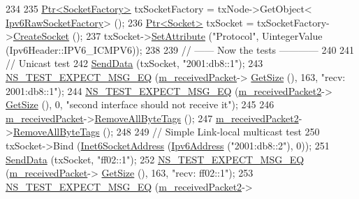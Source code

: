 \begin{DoxyCode}
234 
235   \hyperlink{classns3_1_1Ptr}{Ptr<SocketFactory>} txSocketFactory = txNode->GetObject<
      \hyperlink{classns3_1_1Ipv6RawSocketFactory}{Ipv6RawSocketFactory}> ();
236   \hyperlink{classns3_1_1Ptr}{Ptr<Socket>} txSocket = txSocketFactory->\hyperlink{classns3_1_1Socket_ad448a62bb50ad3dbac59c879a885a8d2}{CreateSocket} ();
237   txSocket->\hyperlink{classns3_1_1ObjectBase_ac60245d3ea4123bbc9b1d391f1f6592f}{SetAttribute} (\textcolor{stringliteral}{"Protocol"}, UintegerValue (Ipv6Header::IPV6\_ICMPV6));
238 
239   \textcolor{comment}{// ------ Now the tests ------------}
240 
241   \textcolor{comment}{// Unicast test}
242   \hyperlink{classIpv6RawSocketImplTest_adc52ab615ef78fee05ac8783d94ce799}{SendData} (txSocket, \textcolor{stringliteral}{"2001:db8::1"});
243   \hyperlink{group__testing_ga7304ba46a28d8cf08dfdfd6499cf7068}{NS\_TEST\_EXPECT\_MSG\_EQ} (\hyperlink{classIpv6RawSocketImplTest_a57057bfb5f48de92165d7c3dfb8ff7ea}{m\_receivedPacket}->
      \hyperlink{classns3_1_1Packet_a462855c9929954d4301a4edfe55f4f1c}{GetSize} (), 163, \textcolor{stringliteral}{"recv: 2001:db8::1"});
244   \hyperlink{group__testing_ga7304ba46a28d8cf08dfdfd6499cf7068}{NS\_TEST\_EXPECT\_MSG\_EQ} (\hyperlink{classIpv6RawSocketImplTest_a1b23c24c9271e6874968546857829676}{m\_receivedPacket2}->
      \hyperlink{classns3_1_1Packet_a462855c9929954d4301a4edfe55f4f1c}{GetSize} (), 0, \textcolor{stringliteral}{"second interface should not receive it"});
245 
246   \hyperlink{classIpv6RawSocketImplTest_a57057bfb5f48de92165d7c3dfb8ff7ea}{m\_receivedPacket}->\hyperlink{classns3_1_1Packet_a083f54c9db31aeff30551a9e20fcda42}{RemoveAllByteTags} ();
247   \hyperlink{classIpv6RawSocketImplTest_a1b23c24c9271e6874968546857829676}{m\_receivedPacket2}->\hyperlink{classns3_1_1Packet_a083f54c9db31aeff30551a9e20fcda42}{RemoveAllByteTags} ();
248 
249   \textcolor{comment}{// Simple Link-local multicast test}
250   txSocket->Bind (\hyperlink{classns3_1_1Inet6SocketAddress}{Inet6SocketAddress} (\hyperlink{classns3_1_1Ipv6Address}{Ipv6Address} (\textcolor{stringliteral}{"2001:db8::2"}), 0));
251   \hyperlink{classIpv6RawSocketImplTest_adc52ab615ef78fee05ac8783d94ce799}{SendData} (txSocket, \textcolor{stringliteral}{"ff02::1"});
252   \hyperlink{group__testing_ga7304ba46a28d8cf08dfdfd6499cf7068}{NS\_TEST\_EXPECT\_MSG\_EQ} (\hyperlink{classIpv6RawSocketImplTest_a57057bfb5f48de92165d7c3dfb8ff7ea}{m\_receivedPacket}->
      \hyperlink{classns3_1_1Packet_a462855c9929954d4301a4edfe55f4f1c}{GetSize} (), 163, \textcolor{stringliteral}{"recv: ff02::1"});
253   \hyperlink{group__testing_ga7304ba46a28d8cf08dfdfd6499cf7068}{NS\_TEST\_EXPECT\_MSG\_EQ} (\hyperlink{classIpv6RawSocketImplTest_a1b23c24c9271e6874968546857829676}{m\_receivedPacket2}->

\end{DoxyCode}
